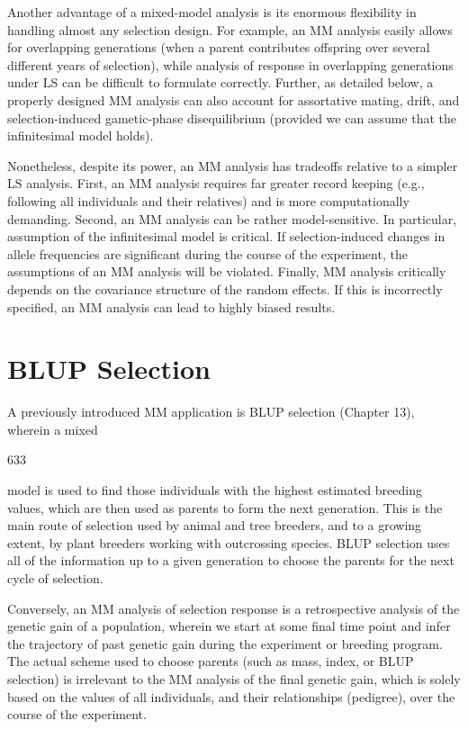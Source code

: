 \documentclass{article}
\begin{document}
Another advantage of a mixed-model analysis is its enormous flexibility in handling almost any selection design. For example, an MM analysis easily allows for overlapping generations (when a parent contributes offspring over several different years of selection), while analysis of response in overlapping generations under LS can be difficult to formulate correctly. Further, as detailed below, a properly designed MM analysis can also account for assortative mating, drift, and selection-induced gametic-phase disequilibrium (provided we can assume that the infinitesimal model holds).

Nonetheless, despite its power, an MM analysis has tradeoffs relative to a simpler LS analysis. First, an MM analysis requires far greater record keeping (e.g., following all individuals and their relatives) and is more computationally demanding. Second, an MM analysis can be rather model-sensitive. In particular, assumption of the infinitesimal model is critical. If selection-induced changes in allele frequencies are significant during the course of the experiment, the assumptions of an MM analysis will be violated. Finally, MM analysis critically depends on the covariance structure of the random effects. If this is incorrectly specified, an MM analysis can lead to highly biased results.

\section{BLUP Selection}
A previously introduced MM application is BLUP selection (Chapter 13), wherein a mixed

633

model is used to find those individuals with the highest estimated breeding values, which are then used as parents to form the next generation. This is the main route of selection used by animal and tree breeders, and to a growing extent, by plant breeders working with outcrossing species. BLUP selection uses all of the information up to a given generation to choose the parents for the next cycle of selection.

Conversely, an MM analysis of selection response is a retrospective analysis of the genetic gain of a population, wherein we start at some final time point and infer the trajectory of past genetic gain during the experiment or breeding program. The actual scheme used to choose parents (such as mass, index, or BLUP selection) is irrelevant to the MM analysis of the final genetic gain, which is solely based on the values of all individuals, and their relationships (pedigree), over the course of the experiment.
\end{document}
